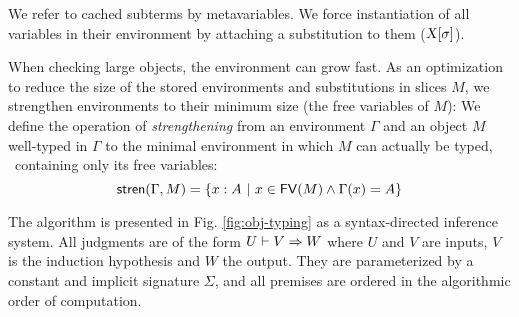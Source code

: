 \documentclass[9pt]{sigplanconf}
\begin{document}
We refer to cached subterms by metavariables. We force instantiation
of all variables in their environment by attaching a substitution to
them (${\text{\textsl{X}}}[{\sigma}]$).

When checking large objects, the environment can grow fast. As an
optimization to reduce the size of the stored environments and
substitutions in slices $M$, we strengthen environments to their
minimum size (the free variables of $M$): We define the operation of
\emph{strengthening} from an environment $\Gamma$ and an object $M$
well-typed in $\Gamma$ to the minimal environment in which $M$ can
actually be typed, \ie\ containing only its free variables:
$$
{\text{\textsf{stren}}}({\Gamma,M}) = \{x : A\ |\ x\in {\text{\textsf{FV}}}({M}) \wedge \Gamma(x)=A\}
$$

The algorithm is presented in Fig. \ref{fig:obj-typing} as a
syntax-directed inference system. All judgments are of the form ${U}\vdash{{V}\Rightarrow{W}}$ where $U$ and $V$ are inputs, $V$ is the induction hypothesis
and $W$ the output. They are parameterized by a constant and implicit
signature $\Sigma$, and all premises are ordered in the algorithmic
order of computation.
\end{document}
